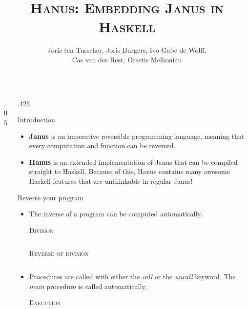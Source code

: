 \documentclass[final,hyperref={pdfpagelabels=false}]{beamer}
\title{\LARGE \textsc{Hanus: Embedding Janus in Haskell}} %
\author{\vspace{1cm} Joris ten Tusscher, Joris Burgers, Ivo Gabe de Wolff,\\ Cas van der Rest, Orestis Melkonian\vspace{1cm}} %
\institute{\Large \emph{Faculty of Science, Utrecht University}} %
\newcommand\sepsize{.05\textwidth}
\newcommand\colsize{.425\textwidth}
\newcommand{\code}[2]{
	\begin{center}
		\vspace{.5cm}
		\textsc{\small #1}\\
		\vspace{.5cm}
	\end{center}
	\begin{minipage}{.9\textwidth}
		\inputminted[frame=lines,framesep=1cm,baselinestretch=.8,linenos,fontsize=\footnotesize]
			{haskell}{code/#2.hs}
	\end{minipage}
}
\begin{document}

\begin{frame}[t] %

\begin{columns}[t] %

\begin{column}{\sepsize}\end{column} %

\begin{column}{\colsize} %


\begin{block}{Introduction}
	\begin{itemize}
		\renewcommand{\baselinestretch}{1.5}
		\item \textbf{Janus} is an imperative reversible programming language, meaning that every computation and function can be reversed.
		\vspace{1cm}
 		\item \textbf{Hanus} is an extended implementation of Janus that can be compiled straight to Haskell. Because of this, Hanus contains many awesome Haskell features that are unthinkable in regular Janus!
	\end{itemize}
\end{block}

\begin{block}{Reverse your program}
	\begin{itemize}
	\item The inverse of a program can be computed automatically.
		\code{Division}{divide}
		\vspace{1cm}
		\code{Reverse of division}{divide_reverse}
	\vspace{1cm}
	\item Procedures are called with either the \textit{call} or the \textit{uncall} keyword. The \textit{main} procedure is called automatically.
		\code{Execution}{call_uncall}
	\end{itemize}
\end{block}


\end{column}
\end{columns}
\end{frame}
\end{document}
